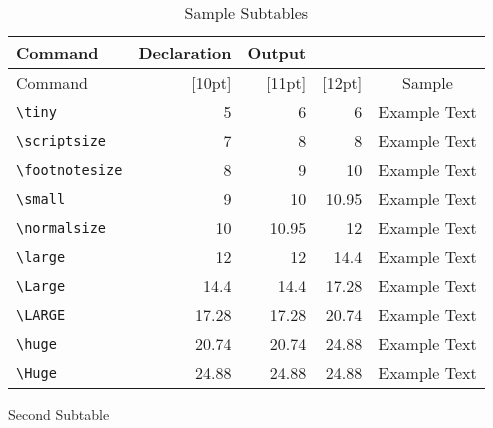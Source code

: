 \documentclass[a4paper]{article}
\begin{document}
\begin{table}[htp]
    \begin{subtable}[htp]{\textwidth}
        \centering
        \renewcommand{\arraystretch}{1.5}
        \begin{tabular}{lrrrc}
        \toprule[1.5pt]
        \textbf{Command} & \textbf{Declaration} & \textbf{Output}\\
        \midrule
        Command       & [10pt]  & [11pt]  & [12pt]  & Sample \\
        \verb|\tiny|         &  5      &  6      &  6      & {\tiny Example Text} \\
        \verb|\scriptsize|   &  7      &  8      &  8      & {\scriptsize Example Text} \\
        \verb|\footnotesize| &  8      &  9      &  10     & {\footnotesize Example Text} \\
        \verb|\small|        &  9      &  10     &  10.95  & {\small Example Text} \\
        \verb|\normalsize|   &  10     &  10.95  &  12     & {\normalsize Example Text} \\
        \verb|\large|        &  12     &  12     &  14.4   & {\large Example Text} \\
        \verb|\Large|        &  14.4   &  14.4   &  17.28  & {\Large Example Text} \\
        \verb|\LARGE|        &  17.28  &  17.28  &  20.74  & {\LARGE Example Text} \\
        \verb|\huge|         &  20.74  &  20.74  &  24.88  & {\huge Example Text} \\
        \verb|\Huge|         &  24.88  &  24.88  &  24.88  & {\Huge Example Text} \\
        \bottomrule[1.5pt]
        \end{tabular}
        \caption{Second Subtable}
        \label{tab:subtable-b}
    \end{subtable}
      \caption{Sample Subtables}
      \label{tab:subtable}
\end{table}

\end{document}
